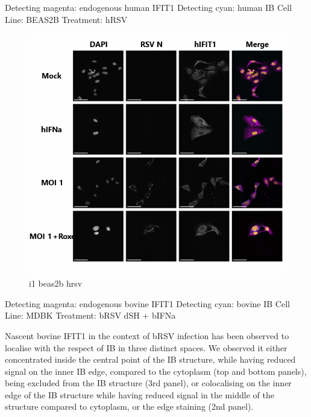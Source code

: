 Detecting magenta: endogenous human IFIT1 \newline
Detecting cyan: human IB \newline
Cell Line: BEAS2B \newline
Treatment: hRSV \newline

\begin{figure}
    \centering
    \includegraphics[width=1\linewidth]{09. Chapter 4/Figs/03. IFIT1/05. beas2b hrsv.png}
    \caption[i1 beas2b hrsv]{i1 beas2b hrsv}
    \label{fig:i1 beas2b hrsv}
\end{figure}

Detecting magenta: endogenous bovine IFIT1 \newline
Detecting cyan: bovine IB \newline
Cell Line: MDBK \newline
Treatment: bRSV dSH + bIFNa \newline

Nascent bovine IFIT1 in the context of bRSV infection has been observed to localise with the respect of IB in three distinct spaces. We observed it either concentrated inside the central point of the IB structure, while having reduced signal on the inner IB edge, compared to the cytoplasm (top and bottom panels), being excluded from the IB structure (3rd panel), or colocalising on the inner edge of the IB structure while having reduced signal in the middle of the structure compared to cytoplasm, or the edge staining (2nd panel).

